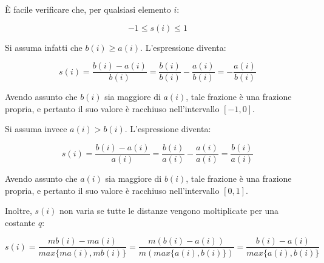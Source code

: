 \documentclass[a4paper, 12pt]{report}
\begin{document}
			È facile verificare che, per qualsiasi elemento $i$:

			\begin{equation*}
				-1 \leq s(i) \leq 1
			\end{equation*}

			Si assuma infatti che $b(i) \geq a(i)$. L'espressione diventa:

			\begin{equation*}
				s(i) = \frac{b(i) - a(i)}{b(i)} =
				\frac{b(i)}{b(i)} - \frac{a(i)}{b(i)} =
				- \frac{a(i)}{b(i)}
			\end{equation*}

			Avendo assunto che $b(i)$ sia maggiore di $a(i)$, tale frazione è una
			frazione propria, e pertanto il suo valore è racchiuso nell'intervallo
			$[-1, 0]$.

			Si assuma invece $a(i) > b(i)$. L'espressione diventa:

			\begin{equation*}
				s(i) = \frac{b(i) - a(i)}{a(i)} =
				\frac{b(i)}{a(i)} - \frac{a(i)}{a(i)} =
				\frac{b(i)}{a(i)}
			\end{equation*}

			Avendo assunto che $a(i)$ sia maggiore di $b(i)$, tale frazione è una
			frazione propria, e pertanto il suo valore è racchiuso nell'intervallo
			$[0, 1]$.

			Inoltre, $s(i)$ non varia se tutte le distanze vengono moltiplicate
			per una costante $q$:

			\begin{equation*}
				s(i) = \frac{m b(i) - m a(i)}{max\{m a(i), m b(i)\}} =
				\frac{m(b(i) - a(i))}{m(max\{a(i), b(i)\})} =
				\frac{b(i) - a(i)}{max\{a(i), b(i)\}}
			\end{equation*}
\end{document}
